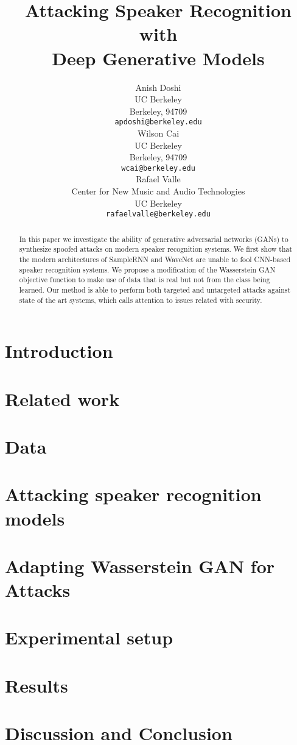 \documentclass{article}
\title{Attacking Speaker Recognition with \\Deep Generative Models}
\author{
  Anish Doshi \\
  UC Berkeley \\
  Berkeley, 94709 \\
  \texttt{apdoshi@berkeley.edu} \\
  \And
  Wilson Cai\\
  UC Berkeley\\
  Berkeley, 94709 \\
  \texttt{wcai@berkeley.edu} \\
  \And
  Rafael Valle \\
  Center for New Music and Audio Technologies \\
  UC Berkeley\\
  \texttt{rafaelvalle@berkeley.edu} \\
}
\begin{document}

\maketitle

\begin{abstract}
    In this paper we investigate the ability of generative adversarial networks (GANs) to synthesize spoofed attacks on modern speaker recognition systems. We first show that the modern architectures of SampleRNN 
    and WaveNet are unable to fool CNN-based speaker recognition systems. We propose  
    a modification of the Wasserstein GAN objective function to make use of data that is 
    real but not from the class being learned. Our method is able to perform both targeted and untargeted attacks against state of the art systems, which calls attention to issues related with security. 
\end{abstract}

\theoremseparator{:}
\newtheorem{hyp}{Hypothesis}

\section{Introduction} \label{sec:introduction}

%
\section{Related work}\label{sec:related_work}

%
\section{Data}\label{sec:method}

%
\section{Attacking speaker recognition models}\label{sec:spk_rec_atks}

%
\section{Adapting Wasserstein GAN for Attacks}\label{sec:wgan}

%
\section{Experimental setup}\label{sec:experiments}
%
\section{Results}
\label{sec:results}

%
\section{Discussion and Conclusion}\label{sec:conclusions}

%



\end{document}
